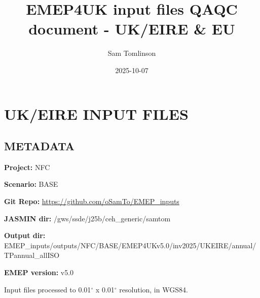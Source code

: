 \documentclass[
]{article}
\title{EMEP4UK input files QAQC document - UK/EIRE \& EU}
\author{Sam Tomlinson}
\date{2025-10-07}
\begin{document}
\maketitle

\section{UK/EIRE INPUT FILES}\label{ukeire-input-files}

\subsection{METADATA}\label{metadata}

\textbf{Project:} NFC

\textbf{Scenario:} BASE

\textbf{Git Repo:} \url{https://github.com/oSamTo/EMEP_inputs}

\textbf{JASMIN dir:} /gws/ssde/j25b/ceh\_generic/samtom

\textbf{Output dir:}
EMEP\_inputs/outputs/NFC/BASE/EMEP4UKv5.0/inv2025/UKEIRE/annual/TPannual\_allISO

\textbf{EMEP version:} v5.0

\vspace{\baselineskip}

Input files processed to 0.01\(^\circ\) x 0.01\(^\circ\) resolution, in
WGS84.

\vspace{\baselineskip}
\end{document}
